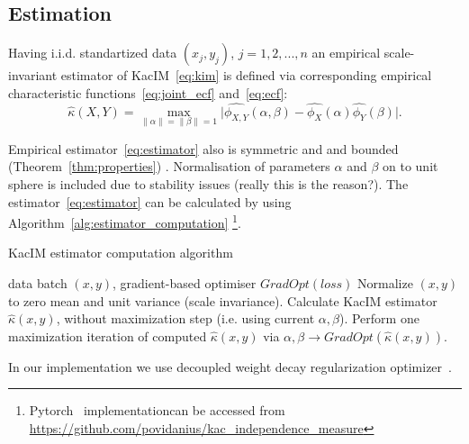 \documentclass{article}
\begin{document}
{%

\subsection{Estimation}

Having i.i.d. standartized data $(x_{j}, y_{j})$, $j = 1,2,...,n$ an empirical scale-invariant estimator of KacIM~\eqref{eq:kim} is defined via corresponding empirical characteristic functions~\eqref{eq:joint_ecf} and~\eqref{eq:ecf}:
\begin{equation}
\label{eq:estimator}
    \hat{\kappa}(X,Y) = \max_{\|\alpha\| = \|\beta\| = 1} \vert \widehat{\phi_{X,Y}}(\alpha,\beta)  - \widehat{\phi_{X}}(\alpha) \widehat{\phi_{Y}}(\beta) \vert.
\end{equation}

\noindent Empirical estimator~\eqref{eq:estimator} also is symmetric and and bounded (Theorem~\ref{thm:properties}) . Normalisation of parameters $\alpha$ and $\beta$ on to unit sphere is included due to stability issues (really this is the reason?). The  estimator~\eqref{eq:estimator} can be calculated by using Algorithm~\ref{alg:estimator_computation} \footnote{ Pytorch~\cite{NEURIPS2019_9015} implementationcan be accessed from \url{https://github.com/povidanius/kac_independence_measure}}. 

\begin{algorithm}
\caption{KacIM estimator computation algorithm}\label{alg:estimator_computation}
\begin{algorithmic}
\Require data batch $(x,y)$, gradient-based optimiser $GradOpt(loss)$
\State Normalize $(x,y)$ to zero mean and unit variance (scale invariance).
\State Calculate KacIM estimator $\hat{\kappa}(x,y)$, without maximization step (i.e. using current $\alpha, \beta$).
\State Perform one maximization iteration of computed $\hat{\kappa}(x,y)$ via $\alpha, \beta \rightarrow GradOpt(\hat{\kappa}(x,y))$.
\end{algorithmic}
\end{algorithm}
In our implementation we use decoupled weight decay regularization optimizer~\cite{Loshchilov2019DecoupledWD}.

}
\end{document}
